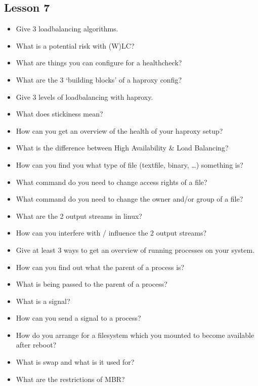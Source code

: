 \documentclass{article}
\begin{document}
\subsection{Lesson 7}

\begin{itemize}
    \item Give 3 loadbalancing algorithms.
    \item What is a potential risk with (W)LC?
    \item What are things you can configure for a healthcheck?
    \item What are the 3 `building blocks' of a haproxy config?
    \item Give 3 levels of loadbalancing with haproxy.
    \item What does stickiness mean?
    \item How can you get an overview of the health of your haproxy setup?
    \item What is the difference between High Availability \& Load Balancing?
    \item How can you find you what type of file (textfile, binary, \dots) something is?
    \item What command do you need to change access rights of a file?
    \item What command do you need to change the owner and/or group of a file?
    \item What are the 2 output streams in linux?
    \item How can you interfere with / influence the 2 output streams?
    \item Give at least 3 ways to get an overview of running processes on your system.
    \item How can you find out what the parent of a process is?
    \item What is being passed to the parent of a process?
    \item What is a signal?
    \item How can you send a signal to a process?
    \item How do you arrange for a filesystem which you mounted to become available after reboot?
    \item What is swap and what is it used for?
    \item What are the restrictions of MBR? 
\end{itemize}
\end{document}

